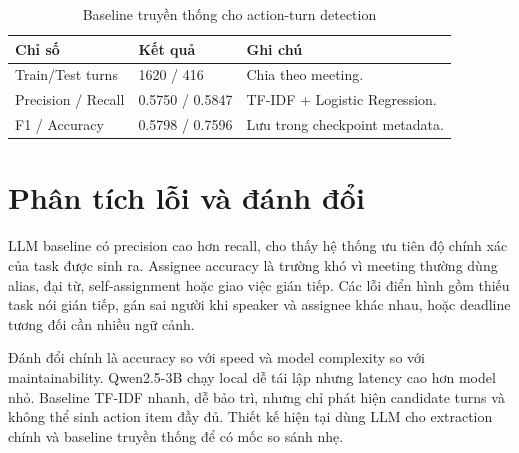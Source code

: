 \begin{table}[H]
\centering
\small
\caption{Baseline truyền thống cho action-turn detection}
\label{tab:turn-results}
\begin{tabularx}{\textwidth}{@{}p{4.0cm}p{2.4cm}X@{}}
\toprule
\textbf{Chỉ số} & \textbf{Kết quả} & \textbf{Ghi chú} \\
\midrule
Train/Test turns & 1620 / 416 & Chia theo meeting. \\
Precision / Recall & 0.5750 / 0.5847 & TF-IDF + Logistic Regression. \\
F1 / Accuracy & 0.5798 / 0.7596 & Lưu trong checkpoint metadata. \\
\bottomrule
\end{tabularx}
\end{table}

\section{Phân tích lỗi và đánh đổi}

LLM baseline có precision cao hơn recall, cho thấy hệ thống ưu tiên độ chính xác của task được sinh ra. Assignee accuracy là trường khó vì meeting thường dùng alias, đại từ, self-assignment hoặc giao việc gián tiếp. Các lỗi điển hình gồm thiếu task nói gián tiếp, gán sai người khi speaker và assignee khác nhau, hoặc deadline tương đối cần nhiều ngữ cảnh.

Đánh đổi chính là accuracy so với speed và model complexity so với maintainability. Qwen2.5-3B chạy local dễ tái lập nhưng latency cao hơn model nhỏ. Baseline TF-IDF nhanh, dễ bảo trì, nhưng chỉ phát hiện candidate turns và không thể sinh action item đầy đủ. Thiết kế hiện tại dùng LLM cho extraction chính và baseline truyền thống để có mốc so sánh nhẹ.
